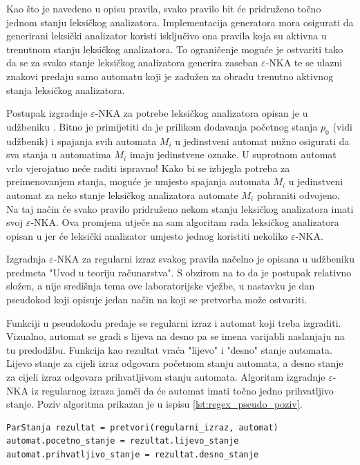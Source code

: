 \documentclass[times, 12pt, utf8]{book}
\begin{document}
Kao što je navedeno u opisu pravila, svako pravilo bit će pridruženo točno jednom stanju leksičkog analizatora.
Implementacija generatora mora osigurati da generirani leksički analizator koristi isključivo ona pravila koja su aktivna u trenutnom stanju leksičkog analizatora.
To ograničenje moguće je ostvariti tako da se za svako stanje leksičkog analizatora generira zaseban \(\varepsilon\)-NKA te se ulazni znakovi predaju samo automatu koji je zadužen za obradu trenutno aktivnog stanja leksičkog analizatora.

Postupak izgradnje \(\varepsilon\)-NKA za potrebe leksičkog analizatora opisan je u udžbeniku \cite[poglavlje 2.9.2]{udzbenik}.
Bitno je primijetiti da je prilikom dodavanja početnog stanja \(p_0\) (vidi udžbenik) i spajanja svih automata \(M_i\) u jedinstveni automat nužno osigurati da sva stanja u automatima \(M_i\) imaju jedinstvene oznake.
U suprotnom automat vrlo vjerojatno neće raditi ispravno!
Kako bi se izbjegla potreba za preimenovanjem stanja, moguće je umjesto spajanja automata \(M_i\) u jedinstveni automat za neko stanje leksičkog analizatora automate \(M_i\) pohraniti odvojeno.
Na taj način će svako pravilo pridruženo nekom stanju leksičkog analizatora imati svoj \(\varepsilon\)-NKA.
Ova promjena utječe na sam algoritam rada leksičkog analizatora opisan u \cite[poglavlje 2.9.7]{udzbenik} jer će leksički analizator umjesto jednog koristiti nekoliko \(\varepsilon\)-NKA.

Izgradnja \(\varepsilon\)-NKA za regularni izraz svakog pravila načelno je opisana u udžbeniku predmeta "Uvod u teoriju računarstva".
S obzirom na to da je postupak relativno složen, a nije središnja tema ove laboratorijske vježbe, u nastavku je dan pseudokod koji opisuje jedan način na koji se pretvorba može ostvariti.

Funkciji u pseudokodu predaje se regularni izraz i automat koji treba izgraditi.
Vizualno, automat se gradi s lijeva na desno pa se imena varijabli naslanjaju na tu predodžbu.
Funkcija kao rezultat vraća "lijevo" i "desno" stanje automata.
Lijevo stanje za cijeli izraz odgovara početnom stanju automata, a desno stanje za cijeli izraz odgovara prihvatljivom stanju automata.
Algoritam izgradnje \(\varepsilon\)-NKA iz regularnog izraza jamči da će automat imati točno jedno prihvatljivo stanje.
Poziv algoritma prikazan je u ispisu \ref{lst:regex_pseudo_poziv}.

\begin{lstlisting}[caption={Poziv funkcije \texttt{pretvori}.},label=lst:regex_pseudo_poziv]
ParStanja rezultat = pretvori(regularni_izraz, automat)
automat.pocetno_stanje = rezultat.lijevo_stanje
automat.prihvatljivo_stanje = rezultat.desno_stanje
\end{lstlisting}
\end{document}
